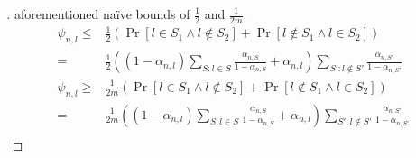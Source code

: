 \begin{proof}[]
  aforementioned naïve bounds of $\frac{1}{2}$ and $\frac{1}{2m}$.
  \begin{align}
    \psi_{n, l} \leq& \frac{1}{2} (\Pr[l \in S_1 \wedge l \notin S_2] + \Pr[l
        \notin S_1 \wedge l \in S_2]) \\
      =& \frac{1}{2}((1 - \alpha_{n, l}) \sum_{S: l \in S} \frac{\alpha_{n,
          S}}{1 - \alpha_{n, S}} + \alpha_{n, l}) \sum_{S': l \notin S'}
          \frac{\alpha_{n, S'}}{1 - \alpha_{n, S'}} \\
    \psi_{n, l} \geq& \frac{1}{2m} (\Pr[l \in S_1 \wedge l \notin S_2] + \Pr[l
        \notin S_1 \wedge l \in S_2]) \\
      =& \frac{1}{2m}((1 - \alpha_{n, l}) \sum_{S: l \in S} \frac{\alpha_{n,
          S}}{1 - \alpha_{n, S}} + \alpha_{n, l}) \sum_{S': l \notin S'}
          \frac{\alpha_{n, S'}}{1 - \alpha_{n, S'}} \\
  \end{align}
\end{proof}

